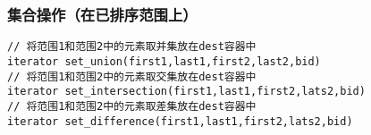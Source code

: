 \subsubsection{集合操作（在已排序范围上）}
\begin{lstlisting}
// 将范围1和范围2中的元素取并集放在dest容器中
iterator set_union(first1,last1,first2,last2,bid)
// 将范围1和范围2中的元素取交集放在dest容器中
iterator set_intersection(first1,last1,first2,lats2,bid)
// 将范围1和范围2中的元素取差集放在dest容器中
iterator set_difference(first1,last1,first2,lats2,bid)
\end{lstlisting}